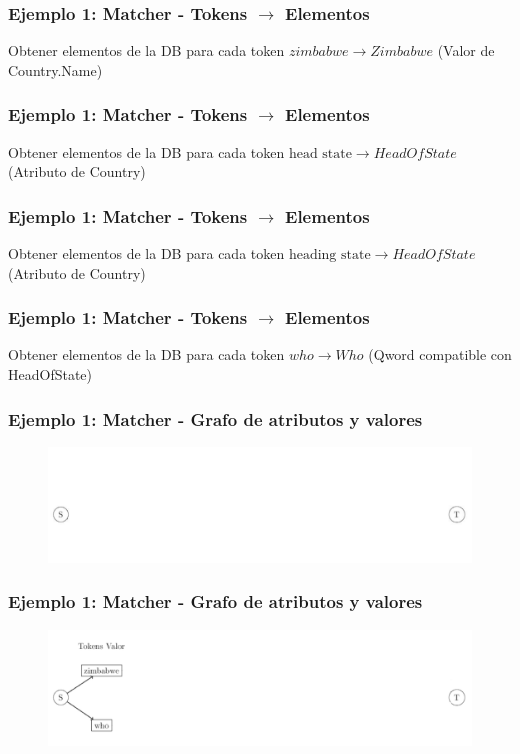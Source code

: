 \begin{frame}[t]
\frametitle{Ejemplo 1: Matcher - Tokens $\rightarrow$ Elementos}
Obtener elementos de la DB para cada token\newline
  \Large{
    $zimbabwe \rightarrow Zimbabwe$ (Valor de Country.Name)
    }
\end{frame}

\begin{frame}[t]
\frametitle{Ejemplo 1: Matcher - Tokens $\rightarrow$ Elementos}
Obtener elementos de la DB para cada token\newline
  \Large{
    $\text{head state} \rightarrow HeadOfState$ (Atributo de Country)
    }
\end{frame}

\begin{frame}[t]
\frametitle{Ejemplo 1: Matcher - Tokens $\rightarrow$ Elementos}
Obtener elementos de la DB para cada token\newline
  \Large{
    $\text{heading state} \rightarrow HeadOfState$ (Atributo de Country)
    }
\end{frame}

\begin{frame}[t]
\frametitle{Ejemplo 1: Matcher - Tokens $\rightarrow$ Elementos}
Obtener elementos de la DB para cada token\newline
  \Large{
    $who \rightarrow Who$ (Qword compatible con HeadOfState)
    }
\end{frame}

\begin{frame}
\frametitle{Ejemplo 1: Matcher - Grafo de atributos y valores}
\begin{figure}
  \centering
    \includegraphics[scale=.33]{graficos/presentacion/ejemplo-grafo-matcher-1-2}
\end{figure}
\end{frame}

\begin{frame}
\frametitle{Ejemplo 1: Matcher - Grafo de atributos y valores}
\begin{figure}
  \centering
    \includegraphics[scale=.33]{graficos/presentacion/ejemplo-grafo-matcher-1-3}
\end{figure}
\end{frame}

